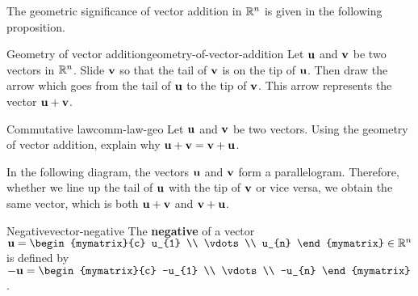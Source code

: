 The geometric significance of vector addition in $\mathbb{R}^n$ is given in
the following proposition.

\begin{proposition}{Geometry of vector addition}{geometry-of-vector-addition}
  Let $\mbox{\bf u}$ and $\mbox{\bf v}$ be two vectors in $\mathbb{R}^n$. Slide
  $\mbox{\bf v}$ so that the tail of $\mbox{\bf v}$ is on the tip of
  $\mbox{\bf u}$. Then draw the arrow which goes from the tail of
  $\mbox{\bf u}$ to the tip of $\mbox{\bf v}$.  This arrow represents the
  vector $\mbox{\bf u}+\mbox{\bf v}$.

  \begin{center}
  \end{center}
\end{proposition}

\begin{example}{Commutative law}{comm-law-geo}
  Let $\mbox{\bf u}$ and $\mbox{\bf v}$ be two vectors. Using the geometry of
  vector addition, explain why $\mbox{\bf u}+\mbox{\bf v} = \mbox{\bf v} + \mbox{\bf u}$.
\end{example}

\begin{solution}
  In the following diagram, the vectors $\mbox{\bf u}$ and $\mbox{\bf v}$ form
  a parallelogram. Therefore, whether we line up the tail of
  $\mbox{\bf u}$ with the tip of $\mbox{\bf v}$ or vice versa, we obtain the
  same vector, which is both $\mbox{\bf u}+\mbox{\bf v}$ and
  $\mbox{\bf v}+\mbox{\bf u}$.
\begin{center}
\end{center}
\end{solution}

\begin{definition}{Negative}{vector-negative}
  The \textbf{negative}%
   of a vector
  $\vect{u}=\begin{mymatrix}{c}
    u_{1} \\
    \vdots \\
    u_{n}
  \end{mymatrix}\in\R^{n}$ is defined by 
  $-\vect{u} = \begin{mymatrix}{c}
    -u_{1} \\
    \vdots \\
    -u_{n}
  \end{mymatrix}$.
\end{definition}

